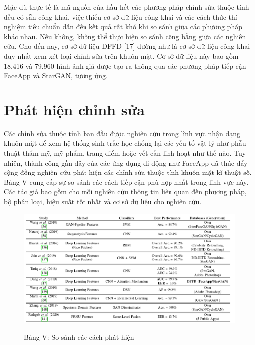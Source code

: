 \documentclass{article}
\begin{document}
Mặc dù thực tế là mã nguồn của hầu hết các phương pháp chỉnh sửa thuộc tính đều có sẵn công khai, việc thiếu cơ sở dữ liệu công khai và các cách thức thí nghiệm tiêu chuẩn dẫn đến kết quả rất khó khi so sánh giữa các phương pháp khác nhau. Nếu không, không thể thực hiện so sánh công bằng giữa các nghiên cứu. Cho đến nay, cơ sở dữ liệu DFFD [17] dường như là cơ sở dữ liệu công khai duy nhất xem xét loại chỉnh sửa trên khuôn mặt. Cơ sở dữ liệu này bao gồm 18.416 và 79.960 hình ảnh giả được tạo ra thông qua các phương pháp tiếp cận FaceApp và StarGAN, tương ứng.

\section{Phát hiện chỉnh sửa}

Các chỉnh sửa thuộc tính ban đầu được nghiên cứu trong lĩnh vực nhận dạng khuôn mặt để xem hệ thống sinh trắc học chống lại các yếu tố vật lý như phẫu thuật thẩm mỹ, mỹ phẩm, trang điểm hoặc vết cắn linh hoạt như thế nào. Tuy nhiên, thành công gần đây của các ứng dụng di động như FaceApp đã thúc đẩy cộng đồng nghiên cứu phát hiện các chỉnh sửa thuộc tính khuôn mặt kĩ thuật số. Bảng V cung cấp sự so sánh các cách tiếp cận phù hợp nhất trong lĩnh vực này. Các tác giả bao gồm cho mỗi nghiên cứu thông tin liên quan đến phương pháp, bộ phân loại, hiệu suất tốt nhất và cơ sở dữ liệu cho nghiên cứu.


\begin{figure}[h!]
\caption{Bảng V: So sánh các cách phát hiện}
\includegraphics[width=\columnwidth]{table-5-compare}
\label{table-5-compare}
\end{figure}
\end{document}
